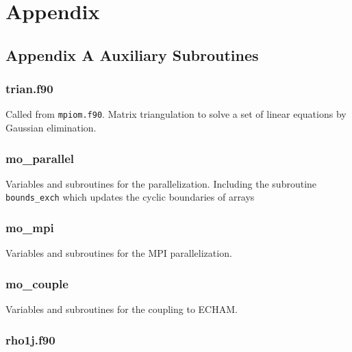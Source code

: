 


\thispagestyle{empty}
\chapter[Appendix]
{\Large{\bf Appendix}}

\section{Appendix A Auxiliary Subroutines}

\subsection{trian.f90}

Called from {\tt mpiom.f90}. Matrix triangulation 
to solve a set of linear equations by Gaussian elimination.

\subsection{mo\_parallel}
\label{ch:appendix:mo-parallel} 

Variables and subroutines for the parallelization.
Including the subroutine {\tt bounds\_exch} which
updates the cyclic boundaries of arrays

\subsection{mo\_mpi}
\label{ch:appendix:mo-mpi} 

Variables and subroutines for the MPI parallelization.

\subsection{mo\_couple}
\label{ch:appendix:mo-couple} 
Variables and subroutines for the coupling to ECHAM.


\subsection{rho1j.f90}

